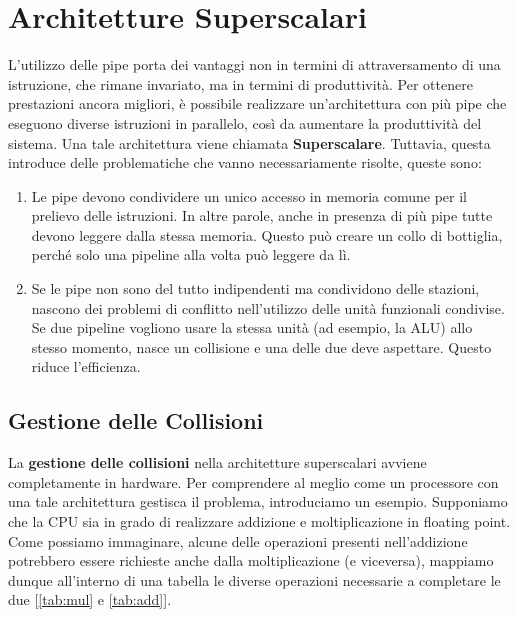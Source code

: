 \section{Architetture Superscalari}
L'utilizzo delle pipe porta dei vantaggi non in termini di attraversamento di una istruzione, che rimane invariato, ma in termini di produttività. Per ottenere prestazioni ancora migliori, è possibile realizzare un'architettura con più pipe che eseguono diverse istruzioni in parallelo, così da aumentare la produttività del sistema. Una tale architettura viene chiamata \textbf{Superscalare}. Tuttavia, questa introduce delle problematiche che vanno necessariamente risolte, queste sono:
\begin{enumerate}
    \item Le pipe devono condividere un unico accesso in memoria comune per il prelievo delle istruzioni. In altre parole, anche in presenza di più pipe tutte devono leggere dalla stessa memoria. Questo può creare un collo di bottiglia, perché solo una pipeline alla volta può leggere da lì.
    \item Se le pipe non sono del tutto indipendenti ma condividono delle stazioni, nascono dei problemi di conflitto nell'utilizzo delle unità funzionali condivise. Se due pipeline vogliono usare la stessa unità (ad esempio, la ALU) allo stesso momento, nasce un collisione e una delle due deve aspettare. Questo riduce l'efficienza.
\end{enumerate}

\subsection{Gestione delle Collisioni}
La \textbf{gestione delle collisioni} nella architetture superscalari avviene completamente in hardware. Per comprendere al meglio come un processore con una tale architettura gestisca il problema, introduciamo un esempio. Supponiamo che la CPU sia in grado di realizzare addizione e moltiplicazione in floating point. Come possiamo immaginare, alcune delle operazioni presenti nell'addizione potrebbero essere richieste anche dalla moltiplicazione (e viceversa), mappiamo dunque all'interno di una tabella le diverse operazioni necessarie a completare le due [\ref{tab:mul} e \ref{tab:add}].

